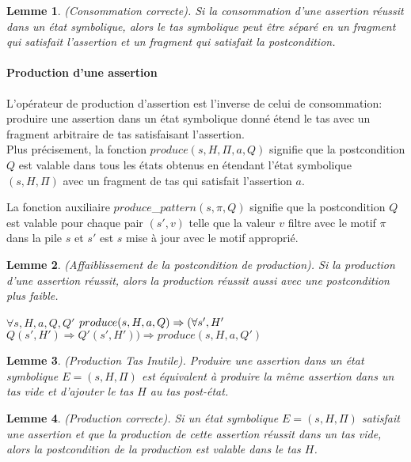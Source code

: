\documentclass[11pt,openany]{article}
\newtheorem{lemme}{Lemme}
\begin{document}
	\begin{lemme}
		(Consommation correcte). Si la consommation d'une assertion r\'eussit dans un \'etat symbolique, alors le tas symbolique peut \^etre s\'epar\'e en un fragment qui satisfait l'assertion et un fragment qui satisfait la postcondition.
	\end{lemme}
			\paragraph{Production d'une assertion}
		L'op\'erateur de production d'assertion est l'inverse de celui de consommation: produire une assertion dans un \'etat symbolique donn\'e \'etend le tas avec un fragment arbitraire de tas satisfaisant l'assertion.\\
		Plus pr\'ecisement, la fonction $produce(s,H,\Pi,a,Q)$ signifie que la postcondition $Q$ est valable  dans tous les \'etats obtenus en \'etendant l'\'etat symbolique $(s, H, \Pi)$ avec un fragment de tas qui satisfait l'assertion $a$.
		
		La fonction auxiliaire $produce$_$pattern(s,\pi,Q)$ signifie que la postcondition $Q$ est valable pour chaque pair $(s',v)$ telle que la valeur $v$ filtre avec le motif $\pi$ dans la pile $s$ et $s'$ est $s$ mise \`a jour avec le motif appropri\'e.
		
		\begin{lemme}
			(Affaiblissement de la postcondition de production). Si la production d'une assertion r\'eussit, alors la production r\'eussit aussi avec une postcondition plus faible.
			
$\forall s,H,a,Q,Q'$ $produce(s,H,a,Q)\Rightarrow\\(\forall s', H'$ $Q(s',H')\Rightarrow Q'(s',H'))\Rightarrow produce(s,H,a,Q')$
		\end{lemme}	
		
		\begin{lemme}
		(Production Tas Inutile). Produire une assertion dans un \'etat symbolique $E = (s,H,\Pi)$  est \'equivalent \`a produire la m\^eme assertion dans un tas vide et d'ajouter le tas $H$ au tas post-\'etat.
		\end{lemme}
	
		\begin{lemme}
		(Production correcte). Si un \'etat symbolique $E=(s,H,\Pi)$ satisfait une assertion et que la production de cette assertion r\'eussit dans un tas vide, alors la postcondition de la production est valable dans le tas $H$.
		\end{lemme}
			
\end{document}

